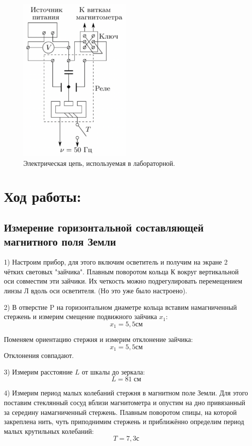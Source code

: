 \documentclass[11pt]{article}
\begin{document}
\begin{figure}[h]
    \centering
    \includegraphics[width=0.5\textwidth]{circuit-scheme.png}
    \caption{Электрическая цепь, используемая в лабораторной.}
    \label{fig:circuit}
\end{figure}

\section{Ход работы:}
\subsection{Измерение горизонтальной составляющей магнитного поля Земли}
1) Настроим прибор, для этого включим осветитель и получим на экране 2 чётких световых "зайчика". Плавным поворотом кольца К вокруг вертикальной
оси совместим эти зайчики. Их четкость можно подрегулировать перемещением линзы Л вдоль оси осветителя. (Но это уже было настроено).


2) В отверстие P на горизонтальном диаметре кольца вставим намагниченный стержень и измерим смещение подвижного зайчика \(x_1\):
\[ x_1 = 5,5 см  \]

Поменяем ориентацию стержня и измерим отклонение зайчика:
\[ x_1 = 5,5 см \]
Отклонения  совпадают.

3) Измерим расстояние \(L\) от шкалы до зеркала:
\[ L = 81\; см \]


4) Измерим период малых колебаний стержня в магнитном поле Земли.
Для этого поставим стеклянный сосуд вблизи магнитометра и опустим на дно привязанный за середину намагниченный стержень. Плавным поворотом спицы, на которой закреплена нить, чуть приподнимим стержень и приближённо определим период малых крутильных колебаний:
\[ T = 7,3 с\]
\end{document}
